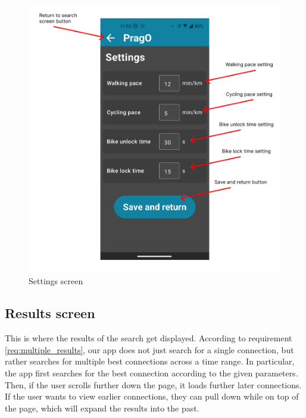 \begin{figure}[h!]
    \centering
    \includegraphics[width=\textwidth]{img/ui_descriptions/settings_screen.pdf}
    \caption{Settings screen}
    \label{fig:settings_screen}
\end{figure}

\newpage


\subsection{Results screen}

This is where the results of the search get displayed. According to requirement \cref{req:multiple_results}, our app does not just search for a single connection, but rather searches for multiple best connections across a time range. In particular, the app first searches for the best connection according to the given parameters. Then, if the user scrolls further down the page, it loads further later connections. If the user wants to view earlier connections, they can pull down while on top of the page, which will expand the results into the past.

